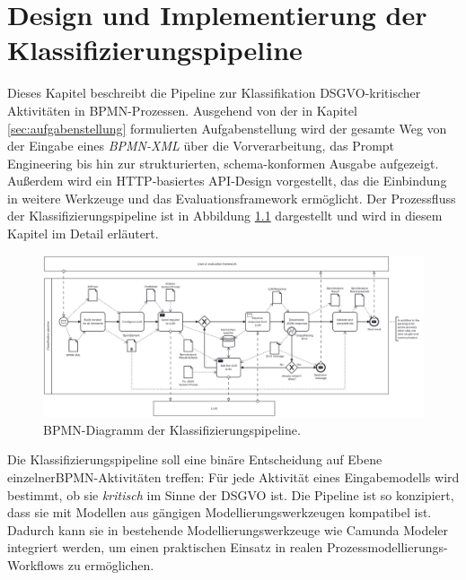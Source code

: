 \chapter{Design und Implementierung der Klassifizierungspipeline}\label{ch:klassifizierungsalgorithmus-(design-und-implementierung)}

Dieses Kapitel beschreibt die Pipeline zur Klassifikation \ac{DSGVO}-kritischer Aktivitäten in \ac{BPMN}-Prozessen. Ausgehend von der in Kapitel \ref{sec:aufgabenstellung} formulierten Aufgabenstellung wird der gesamte Weg von der Eingabe eines \emph{BPMN-XML} über die Vorverarbeitung, das Prompt Engineering bis hin zur strukturierten, schema-konformen Ausgabe aufgezeigt. Außerdem wird ein HTTP-basiertes API-Design vorgestellt, das die Einbindung in weitere Werkzeuge und das Evaluationsframework ermöglicht. Der Prozessfluss der Klassifizierungspipeline ist in Abbildung \ref{fig:architecture-diagram} dargestellt und wird in diesem Kapitel im Detail erläutert.

\begin{figure}[h]
    \centering
    \includegraphics[width=\textwidth]{images/classification/classification-pipeline-diagram-en}
    \caption{\ac{BPMN}-Diagramm der Klassifizierungspipeline.}
    \label{fig:architecture-diagram}
\end{figure}

Die Klassifizierungspipeline soll eine binäre Entscheidung auf Ebene einzelner\linebreak\ac{BPMN}-Aktivitäten treffen: Für jede Aktivität eines Eingabemodells wird bestimmt, ob sie \emph{kritisch} im Sinne der \ac{DSGVO} ist. Die Pipeline ist so konzipiert, dass sie mit Modellen aus gängigen Modellierungswerkzeugen kompatibel ist. Dadurch kann sie in bestehende Modellierungswerkzeuge wie Camunda Modeler \cite{camunda} integriert werden, um einen praktischen Einsatz in realen Prozessmodellierungs-Workflows zu ermöglichen.







